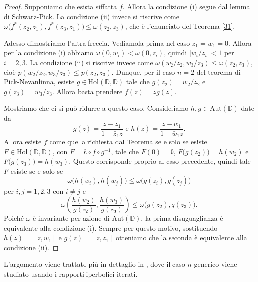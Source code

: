 \begin{proof}
  Supponiamo che esista siffatta $f$. Allora la condizione (i) segue dal lemma di Schwarz-Pick. La condizione (ii) invece si riscrive come $\omega\bigl(f^*(z_2,z_1),f^*(z_3,z_1)\bigr) \le \omega(z_2,z_3)$, che è l'enunciato del Teorema \ref{31}.

  Adesso dimostriamo l'altra freccia. Vediamola prima nel caso $z_1=w_1=0$. Allora per la condizione (i) abbiamo $\omega(0,w_i) < \omega(0,z_i)$, quindi $|w_i/z_i|<1$ per $i=2,3$. La condizione (ii) si riscrive invece come $\omega(w_2/z_2,w_3/z_3) \le \omega(z_2,z_3)$, cioè $p(w_2/z_2,w_3/z_3) \le p(z_2,z_3)$.
  Dunque, per il caso $n=2$ del teorema di Pick-Nevanlinna, esiste $g \in \text{Hol}(\mathbb{D},\mathbb{D})$ tale che $g(z_2)=w_2/z_2$ e $g(z_3)=w_3/z_3$. Allora basta prendere $f(z)=zg(z)$.

   Mostriamo che ci si può ridurre a questo caso. Consideriamo $h, g \in \text{Aut}(\mathbb{D})$ date da
   $$g(z)=\frac{z-z_1}{1-\bar{z}_1z} \,\, \text{e} \,\, h(z)=\frac{z-w_1}{1-\bar{w}_1z}.$$
   Allora esiste $f$ come quella richiesta dal Teorema se e solo se esiste $F \in \text{Hol}(\mathbb{D},\mathbb{D})$, con $F=h \circ f \circ g^{-1}$, tale che $F(0)=0$, $F\bigl(g(z_2)\bigr)=h(w_2)$ e $F\bigl(g(z_3)\bigr)=h(w_3)$.
   Questo corrisponde proprio al caso precedente, quindi tale $F$ esiste se e solo se
   $$\omega\bigl(h(w_i),h(w_j)\bigr) \le \omega\bigl(g(z_i),g(z_j)\bigr)$$
   per $i,j=1,2,3$ con $i\not=j$ e
   $$\omega\left(\frac{h(w_2)}{g(z_2)},\frac{h(w_3)}{g(z_3)}\right) \le \omega\bigl(g(z_2),g(z_3)\bigr).$$
   Poiché $\omega$ è invariante per azione di $\text{Aut}(\mathbb{D})$, la prima disuguaglianza è equivalente alla condizione (i). Sempre per questo motivo, sostituendo $h(z)=[z,w_1]$ e $g(z)=[z,z_1]$ otteniamo che la seconda è equivalente alla condizione (ii).
\end{proof}

L'argomento viene trattato più in dettaglio in \cite{BRW}, dove il caso $n$ generico viene studiato usando i rapporti iperbolici iterati.
